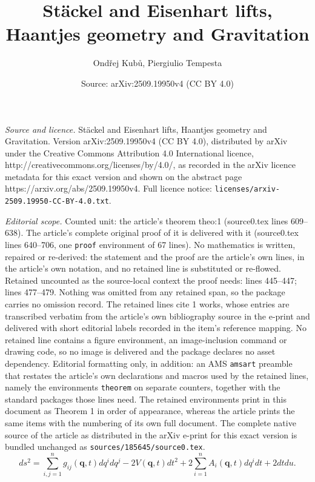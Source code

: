 \documentclass[10pt,a4paper]{amsart}
\title{St\"ackel and Eisenhart lifts, Haantjes geometry and Gravitation}
\author{Ond\v{r}ej Kub\r{u}, Piergiulio Tempesta}
\date{Source: arXiv:2509.19950v4 (CC BY 4.0)}
\newcommand{\bs}{\boldsymbol}
\begin{document}
\maketitle

\noindent\emph{Source and licence.} St\"ackel and Eisenhart lifts, Haantjes geometry and Gravitation. Version arXiv:2509.19950v4 (CC BY 4.0), distributed by arXiv under the Creative Commons Attribution 4.0 International licence, http://creativecommons.org/licenses/by/4.0/, as recorded in the arXiv licence metadata for this exact version and shown on the abstract page https://arxiv.org/abs/2509.19950v4. Full licence notice: \texttt{licenses/arxiv-2509.19950-CC-BY-4.0.txt}.\par\smallskip

\noindent\textit{Editorial scope.} Counted unit: the article's theorem theo:1 (source0.tex lines 609--638). The article's complete original proof of it is delivered with it (source0.tex lines 640--706, one \texttt{proof} environment of 67 lines). No mathematics is written, repaired or re-derived: the statement and the proof are the article's own lines, in the article's own notation, and no retained line is substituted or re-flowed.  Retained uncounted as the source-local context the proof needs: lines 445--447; lines 477--479.  Nothing was omitted from any retained span, so the package carries no omission record.  The retained lines cite 1 works, whose entries are transcribed verbatim from the article's own bibliography source in the e-print and delivered with short editorial labels recorded in the item's reference mapping.  No retained line contains a figure environment, an image-inclusion command or drawing code, so no image is delivered and the package declares no asset dependency.  Editorial formatting only, in addition: an AMS \texttt{amsart} preamble that restates the article's own declarations and macros used by the retained lines, namely the environments \texttt{theorem} on separate counters, together with the standard packages those lines need.  The retained environments print in this document as Theorem 1 in order of appearance, whereas the article prints the same items with the numbering of its own full document.  The complete native source of the article as distributed in the arXiv e-print for this exact version is bundled unchanged as \texttt{sources/185645/source0.tex}.
	\begin{equation} \label{eq:3.3}
		ds^2=\sum_{i,j=1}^{n} g_{ij}(\bs{q},t)dq^{i} d q^{j}-2V(\bs{q},t)dt^2+2\sum_{i=1}^{n} A_i(\bs{q},t)dq^i dt+2 dt du.
	\end{equation}
\end{document}
